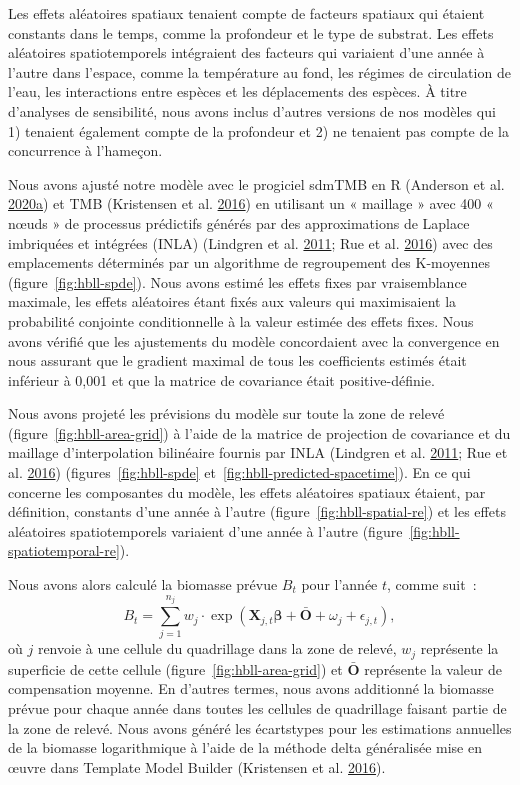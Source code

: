 \documentclass[french,11pt]{book}
\begin{document}
Les effets aléatoires spatiaux tenaient compte de facteurs spatiaux qui étaient constants dans le temps, comme la profondeur et le type de substrat. Les effets aléatoires spatiotemporels intégraient des facteurs qui variaient d'une année à l'autre dans l'espace, comme la température au fond, les régimes de circulation de l'eau, les interactions entre espèces et les déplacements des espèces. À titre d'analyses de sensibilité, nous avons inclus d'autres versions de nos modèles qui 1) tenaient également compte de la profondeur et 2) ne tenaient pas compte de la concurrence à l'hameçon.

Nous avons ajusté notre modèle avec le progiciel sdmTMB en R (Anderson et al. \protect\hyperlink{ref-sdmtmb}{2020}\protect\hyperlink{ref-sdmtmb}{a}) et TMB (Kristensen et al. \protect\hyperlink{ref-tmb}{2016}) en utilisant un « maillage » avec 400 « nœuds » de processus prédictifs générés par des approximations de Laplace imbriquées et intégrées (INLA) (Lindgren et al. \protect\hyperlink{ref-lindgren2011}{2011}; Rue et al. \protect\hyperlink{ref-rue2016}{2016}) avec des emplacements déterminés par un algorithme de regroupement des K-moyennes (figure~\ref{fig:hbll-spde}). Nous avons estimé les effets fixes par vraisemblance maximale, les effets aléatoires étant fixés aux valeurs qui maximisaient la probabilité conjointe conditionnelle à la valeur estimée des effets fixes. Nous avons vérifié que les ajustements du modèle concordaient avec la convergence en nous assurant que le gradient maximal de tous les coefficients estimés était inférieur à 0,001 et que la matrice de covariance était positive-définie.

Nous avons projeté les prévisions du modèle sur toute la zone de relevé (figure~\ref{fig:hbll-area-grid}) à l'aide de la matrice de projection de covariance et du maillage d'interpolation bilinéaire fournis par INLA (Lindgren et al. \protect\hyperlink{ref-lindgren2011}{2011}; Rue et al. \protect\hyperlink{ref-rue2016}{2016}) (figures~\ref{fig:hbll-spde} et~\ref{fig:hbll-predicted-spacetime}). En ce qui concerne les composantes du modèle, les effets aléatoires spatiaux étaient, par définition, constants d'une année à l'autre (figure~\ref{fig:hbll-spatial-re}) et les effets aléatoires spatiotemporels variaient d'une année à l'autre (figure~\ref{fig:hbll-spatiotemporal-re}).

Nous avons alors calculé la biomasse prévue \(B_t\) pour l'année \(t\), comme suit~:
\begin{equation}
B_t = \sum_{j = 1}^{n_j}
  w_j \cdot \exp \left( \bm{X}_{j,t} \bm{\beta} + \bar{\bm{O}} + \omega_j + \epsilon_{j,t} \right),
\end{equation}
où \(j\) renvoie à une cellule du quadrillage dans la zone de relevé, \(w_j\) représente la superficie de cette cellule (figure~\ref{fig:hbll-area-grid}) et \(\bar{\bm{O}}\) représente la valeur de compensation moyenne. En d'autres termes, nous avons additionné la biomasse prévue pour chaque année dans toutes les cellules de quadrillage faisant partie de la zone de relevé. Nous avons généré les écarts­types pour les estimations annuelles de la biomasse logarithmique à l'aide de la méthode delta généralisée mise en œuvre dans Template Model Builder (Kristensen et al. \protect\hyperlink{ref-tmb}{2016}).
\end{document}

